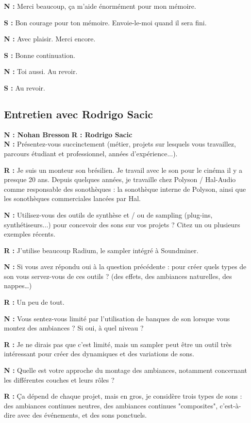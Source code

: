﻿\documentclass[12pt]{article}
\begin{document}
\textbf{N :} Merci beaucoup, ça m’aide énormément pour mon mémoire.

\textbf{S :} Bon courage pour ton mémoire. Envoie-le-moi quand il sera fini.

\textbf{N :} Avec plaisir. Merci encore.

\textbf{S :} Bonne continuation.

\textbf{N :} Toi aussi. Au revoir.

\textbf{S :} Au revoir.

\subsection{Entretien avec Rodrigo Sacic}
\setlength{\parindent}{0pt}
\textbf{N : Nohan Bresson 
} 
\textbf{R : Rodrigo Sacic}  
\\

\textbf{N :} Présentez-vous succinctement (métier, projets sur lesquels vous travaillez, parcours étudiant et professionnel, années d’expérience...).

\textbf{R :} Je suis un monteur son brésilien. Je travail avec le son pour le cinéma il y a presque 20 ans. Depuis quelques années, je travaille chez Polyson / Hal-Audio comme responsable des sonothèques : la sonothèque interne de Polyson, ainsi que les sonothèques commerciales lancées par Hal.

\textbf{N :} Utilisez-vous des outils de synthèse et / ou de sampling (plug-ins, synthétiseurs...) pour concevoir des sons sur vos projets ? Citez un ou plusieurs exemples récents.

\textbf{R :} J’utilise beaucoup Radium, le sampler intégré à Soundminer.

\textbf{N :} Si vous avez répondu oui à la question précédente : pour créer quels types de son vous servez-vous de ces outils ? (des effets, des ambiances naturelles, des nappes…)

\textbf{R :} Un peu de tout.

\textbf{N :} Vous sentez-vous limité par l'utilisation de banques de son lorsque vous montez des ambiances ? Si oui, à quel niveau ?

\textbf{R :} Je ne dirais pas que c’est limité, mais un sampler peut être un outil très intéressant pour créer des dynamiques et des variations de sons.

\textbf{N :} Quelle est votre approche du montage des ambiances, notamment concernant les différentes couches et leurs rôles ?

\textbf{R :} Ça dépend de chaque projet, mais en gros, je considère trois types de sons : des ambiances continues neutres, des ambiances continues "composites", c'est-à-dire avec des événements, et des sons ponctuels.
\end{document}
